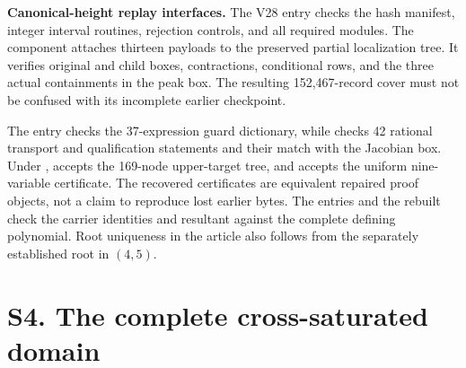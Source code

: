 \documentclass[10pt]{article}
\begin{document}
\textbf{Canonical-height replay interfaces.}
The V28 entry  checks the hash manifest,
integer interval routines, rejection controls, and all required modules.
The component  attaches thirteen
 payloads to the preserved partial
localization tree. It verifies original and child boxes, contractions,
conditional rows, and the three actual containments in the peak box.
The resulting 152,467-record cover must not be confused with its
incomplete earlier checkpoint.

The entry  checks the 37-expression
guard dictionary, while  checks 42 rational
transport and qualification statements and their match with the
Jacobian box. Under ,
 accepts the 169-node upper-target
tree, and  accepts the uniform
nine-variable certificate. The recovered certificates are equivalent
repaired proof objects, not a claim to reproduce lost earlier bytes.
The entries  and the rebuilt
 check the carrier identities and resultant
against the complete defining polynomial. Root uniqueness in the
article also follows from the separately established root in $(4,5)$.

\section*{S4. The complete cross-saturated domain}
\end{document}
